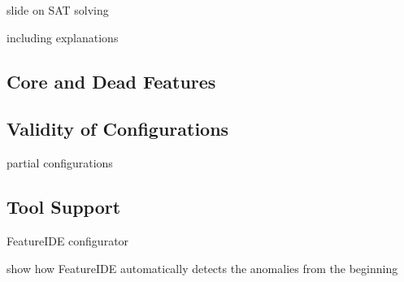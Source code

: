 slide on SAT solving

including explanations

\subsection{Core and Dead Features}

\subsection{Validity of Configurations}

partial configurations

%
%

\subsection{Tool Support}

FeatureIDE configurator

show how FeatureIDE automatically detects the anomalies from the beginning


